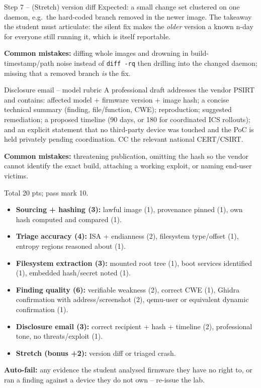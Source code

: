 \documentclass[11pt,a4paper]{article}
\begin{document}
\begin{solutionbox}{Step 7 -- (Stretch) version diff}
Expected: a small change set clustered on one daemon, e.g.\ the
hard-coded branch removed in the newer image. The takeaway the student
must articulate: the silent fix makes the \emph{older} version a known
n-day for everyone still running it, which is itself reportable.

\textbf{Common mistakes:} diffing whole images and drowning in
build-timestamp/path noise instead of \texttt{diff -rq} then drilling
into the changed daemon; missing that a removed branch \emph{is} the
fix.
\end{solutionbox}

\begin{solutionbox}{Disclosure email -- model rubric}
A professional draft addresses the vendor PSIRT and contains: affected
model + firmware version + image hash; a concise technical summary
(finding, file/function, CWE); reproduction; suggested remediation;
a proposed timeline (90 days, or 180 for coordinated ICS rollouts);
and an explicit statement that no third-party device was touched and
the PoC is held privately pending coordination. CC the relevant
national CERT/CSIRT.

\textbf{Common mistakes:} threatening publication, omitting the hash so
the vendor cannot identify the exact build, attaching a working
exploit, or naming end-user victims.
\end{solutionbox}

\begin{rubricbox}
Total 20 pts; pass mark 10.
\begin{itemize}\setlength{\itemsep}{1pt}
  \item \textbf{Sourcing + hashing (3):} lawful image (1), provenance
        pinned (1), own hash computed and compared (1).
  \item \textbf{Triage accuracy (4):} ISA + endianness (2), filesystem
        type/offset (1), entropy regions reasoned about (1).
  \item \textbf{Filesystem extraction (3):} mounted root tree (1),
        boot services identified (1), embedded hash/secret noted (1).
  \item \textbf{Finding quality (6):} verifiable weakness (2), correct
        CWE (1), Ghidra confirmation with address/screenshot (2),
        qemu-user or equivalent dynamic confirmation (1).
  \item \textbf{Disclosure email (3):} correct recipient + hash +
        timeline (2), professional tone, no threats/exploit (1).
  \item \textbf{Stretch (bonus +2):} version diff or triaged crash.
\end{itemize}
\textbf{Auto-fail:} any evidence the student analysed firmware they
have no right to, or ran a finding against a device they do not own --
re-issue the lab.
\end{rubricbox}
\end{document}
